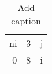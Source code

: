 \documentclass[../templates/main]{subfiles}
\begin{document}
\begin{table}[htbp]
  \centering
  \caption{Add caption}
  \begin{tabular}{rrl}
    \multicolumn{1}{l}{ni} & 3 & j \\
    0                      & 8 & i \\

  \end{tabular}%
  \label{tab:addlabel}%
\end{table}%
\end{document}
